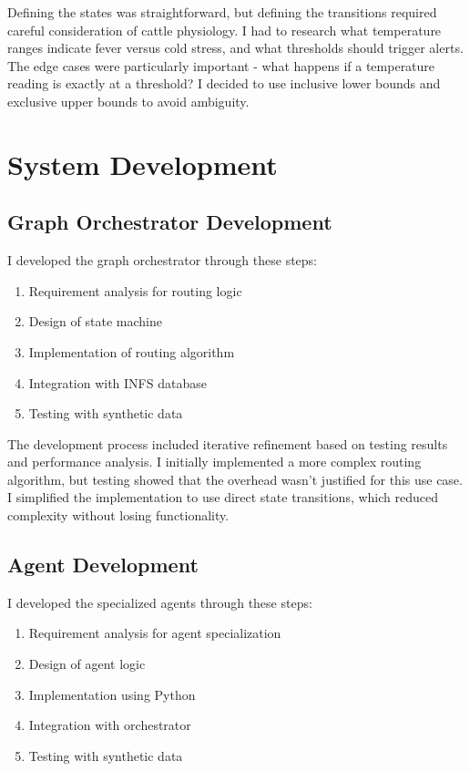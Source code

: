Defining the states was straightforward, but defining the transitions required careful consideration of cattle physiology. I had to research what temperature ranges indicate fever versus cold stress, and what thresholds should trigger alerts. The edge cases were particularly important - what happens if a temperature reading is exactly at a threshold? I decided to use inclusive lower bounds and exclusive upper bounds to avoid ambiguity.

\section{System Development}

\subsection{Graph Orchestrator Development}

I developed the graph orchestrator through these steps:

\begin{enumerate}
    \item Requirement analysis for routing logic
    \item Design of state machine
    \item Implementation of routing algorithm
    \item Integration with INFS database
    \item Testing with synthetic data
\end{enumerate}

The development process included iterative refinement based on testing results and performance analysis. I initially implemented a more complex routing algorithm, but testing showed that the overhead wasn't justified for this use case. I simplified the implementation to use direct state transitions, which reduced complexity without losing functionality.

\subsection{Agent Development}

I developed the specialized agents through these steps:

\begin{enumerate}
    \item Requirement analysis for agent specialization
    \item Design of agent logic
    \item Implementation using Python
    \item Integration with orchestrator
    \item Testing with synthetic data
\end{enumerate}

